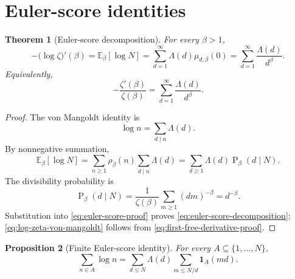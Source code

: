 \documentclass[11pt]{article}
\numberwithin{equation}{section}
\newtheorem{theorem}{Theorem}[section]
\newtheorem{proposition}[theorem]{Proposition}
\theoremstyle{definition}
\theoremstyle{remark}
\DeclareMathOperator{\Prob}{P}
\newcommand{\E}{\mathbb E}
\newcommand{\1}{\mathbf 1}
\begin{document}
\section{Euler-score identities}

\begin{theorem}[Euler-score decomposition]
\label{thm:euler-score-decomposition}
For every \(\beta>1\),
\begin{equation}
\label{eq:euler-score-decomposition}
-\bigl(\log\zeta\bigr)'(\beta)
=\E_\beta[\log N]
=\sum_{d=1}^{\infty}\Lambda(d)\mu_{d,\beta}(0)
=\sum_{d=1}^{\infty}\frac{\Lambda(d)}{d^\beta}.
\end{equation}
Equivalently,
\begin{equation}
\label{eq:log-zeta-von-mangoldt}
-\frac{\zeta'(\beta)}{\zeta(\beta)}
=\sum_{d=1}^{\infty}\frac{\Lambda(d)}{d^\beta}.
\end{equation}
\end{theorem}

\begin{proof}
The von Mangoldt identity is
\begin{equation}
\label{eq:mangoldt-identity}
\log n=\sum_{d\mid n}\Lambda(d).
\end{equation}
By nonnegative summation,
\begin{equation}
\label{eq:euler-score-proof}
\E_\beta[\log N]
=\sum_{n\ge1}\rho_\beta(n)\sum_{d\mid n}\Lambda(d)
=\sum_{d\ge1}\Lambda(d)\Prob_\beta(d\mid N).
\end{equation}
The divisibility probability is
\begin{equation}
\label{eq:divisibility-probability}
\Prob_\beta(d\mid N)
=\frac1{\zeta(\beta)}\sum_{m\ge1}(dm)^{-\beta}
=d^{-\beta}.
\end{equation}
Substitution into \eqref{eq:euler-score-proof} proves \eqref{eq:euler-score-decomposition}; \eqref{eq:log-zeta-von-mangoldt} follows from \eqref{eq:first-free-derivative-proof}.
\end{proof}

\begin{proposition}[Finite Euler-score identity]
\label{prop:finite-euler-score}
For every \(A\subseteq\{1,\ldots,N\}\),
\begin{equation}
\label{eq:finite-euler-score}
\sum_{n\in A}\log n
=\sum_{d\le N}\Lambda(d)\sum_{m\le N/d}\1_A(md).
\end{equation}
\end{proposition}
\end{document}
